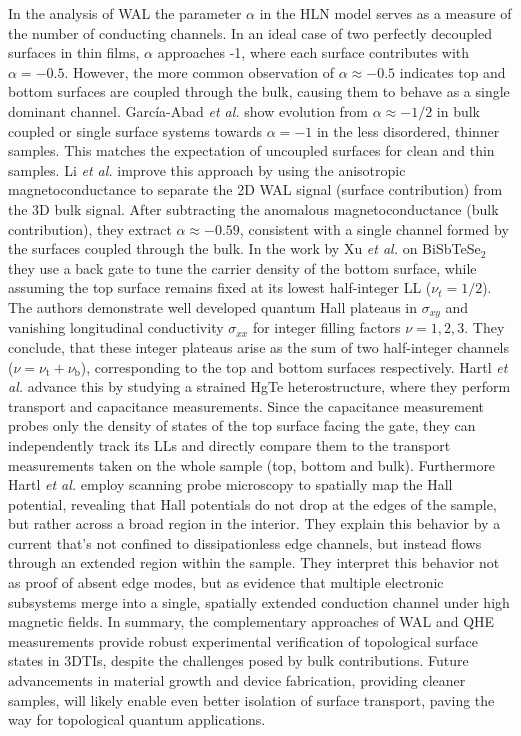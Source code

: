 \documentclass[twocolumn,10pt,a4paper]{article}
\begin{document}
In the analysis of WAL the parameter $\alpha$ in the HLN model serves as a measure of the number of conducting channels. In an ideal case of two perfectly decoupled surfaces in thin films, $\alpha$ approaches -1, where each surface contributes with $\alpha=-0.5$. However, the more common observation of $\alpha \approx -0.5$ indicates top and bottom surfaces are coupled through the bulk, causing them to behave as a single dominant channel. García-Abad \textit{et al.} show evolution from $\alpha \approx -1/2$ in bulk coupled or single surface systems towards $\alpha = -1$ in the less disordered, thinner samples. This matches the expectation of uncoupled surfaces for clean and thin samples. Li \textit{et al.} improve this approach by using the anisotropic magnetoconductance to separate the 2D WAL signal (surface contribution) from the 3D bulk signal. After subtracting the anomalous magnetoconductance (bulk contribution), they extract $\alpha \approx -0.59$, consistent with a single channel formed by the surfaces coupled through the bulk. In the work by Xu \textit{et al.} on BiSbTeSe$_2$ they use a back gate to tune the carrier density of the bottom surface, while assuming the top surface remains fixed at its lowest half-integer LL ($\nu_{t}=1/2$). The authors demonstrate well developed quantum Hall plateaus in $\sigma_{xy}$ and vanishing longitudinal conductivity $\sigma_{xx}$ for integer filling factors $\nu=1, 2, 3$. They conclude, that these integer plateaus arise as the sum of two half-integer channels ($\nu = \nu_\mathrm{t} + \nu_\mathrm{b}$), corresponding to the top and bottom surfaces respectively. Hartl \textit{et al.} advance this by studying a strained HgTe heterostructure, where they perform transport and capacitance measurements. Since the capacitance measurement probes only the density of states of the top surface facing the gate, they can independently track its LLs and directly compare them to the transport measurements taken on the whole sample (top, bottom and bulk). Furthermore Hartl \textit{et al.} employ scanning probe microscopy to spatially map the Hall potential, revealing that Hall potentials do not drop at the edges of the sample, but rather across a broad region in the interior. They explain this behavior by a current that's not confined to dissipationless edge channels, but instead flows through an extended region within the sample. They interpret this behavior not as proof of absent edge modes, but as evidence that multiple electronic subsystems merge into a single, spatially extended conduction channel under high magnetic fields.
In summary, the complementary approaches of WAL and QHE measurements provide robust experimental verification of topological surface states in 3DTIs, despite the challenges posed by bulk contributions. Future advancements in material growth and device fabrication, providing cleaner samples, will likely enable even better isolation of surface transport, paving the way for topological quantum applications.


\end{document}
